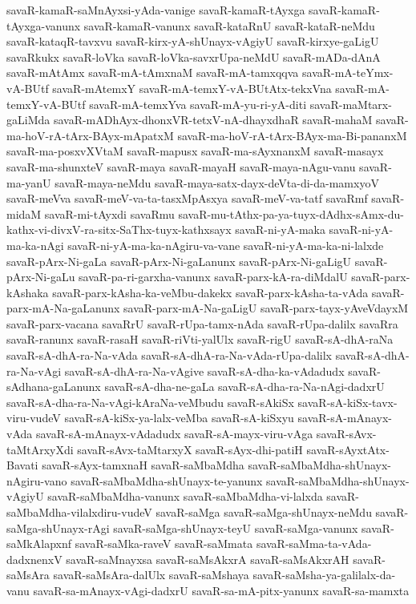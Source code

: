 {savaR-kamaR-saMnAyxsi-yAda-vanige
savaR-kamaR-tAyxga
savaR-kamaR-tAyxga-vanunx
savaR-kamaR-vanunx
savaR-kataRnU
savaR-kataR-neMdu
savaR-kataqR-tavxvu
savaR-kirx-yA-shUnayx-vAgiyU
savaR-kirxye-gaLigU
savaRkukx
savaR-loVka
savaR-loVka-savxrUpa-neMdU
savaR-mADa-dAnA
savaR-mAtAmx
savaR-mA-tAmxnaM
savaR-mA-tamxqqva
savaR-mA-teYmx-vA-BUtf
savaR-mAtemxY
savaR-mA-temxY-vA-BUtAtx-tekxVna
savaR-mA-temxY-vA-BUtf
savaR-mA-temxYva
savaR-mA-yu-ri-yA-diti
savaR-maMtarx-gaLiMda
savaR-mADhAyx-dhonxVR-tetxV-nA-dhayxdhaR
savaR-mahaM
savaR-ma-hoV-rA-tArx-BAyx-mApatxM
savaR-ma-hoV-rA-tArx-BAyx-ma-Bi-pananxM
savaR-ma-posxvXVtaM
savaR-mapusx
savaR-ma-sAyxnanxM
savaR-masayx
savaR-ma-shunxteV
savaR-maya
savaR-mayaH
savaR-maya-nAgu-vanu
savaR-ma-yanU
savaR-maya-neMdu
savaR-maya-satx-dayx-deVta-di-da-mamxyoV
savaR-meVva
savaR-meV-va-ta-tasxMpAsxya
savaR-meV-va-tatf
savaRmf
savaR-midaM
savaR-mi-tAyxdi
savaRmu
savaR-mu-tAthx-pa-ya-tuyx-dAdhx-sAmx-du-kathx-vi-divxV-ra-sitx-SaThx-tuyx-kathxsayx
savaR-ni-yA-maka
savaR-ni-yA-ma-ka-nAgi
savaR-ni-yA-ma-ka-nAgiru-va-vane
savaR-ni-yA-ma-ka-ni-lalxde
savaR-pArx-Ni-gaLa
savaR-pArx-Ni-gaLanunx
savaR-pArx-Ni-gaLigU
savaR-pArx-Ni-gaLu
savaR-pa-ri-garxha-vanunx
savaR-parx-kA-ra-diMdalU
savaR-parx-kAshaka
savaR-parx-kAsha-ka-veMbu-dakekx
savaR-parx-kAsha-ta-vAda
savaR-parx-mA-Na-gaLanunx
savaR-parx-mA-Na-gaLigU
savaR-parx-tayx-yAveVdayxM
savaR-parx-vacana
savaRrU
savaR-rUpa-tamx-nAda
savaR-rUpa-dalilx
savaRra
savaR-ranunx
savaR-rasaH
savaR-riVti-yalUlx
savaR-rigU
savaR-sA-dhA-raNa
savaR-sA-dhA-ra-Na-vAda
savaR-sA-dhA-ra-Na-vAda-rUpa-dalilx
savaR-sA-dhA-ra-Na-vAgi
savaR-sA-dhA-ra-Na-vAgive
savaR-sA-dha-ka-vAdadudx
savaR-sAdhana-gaLanunx
savaR-sA-dha-ne-gaLa
savaR-sA-dha-ra-Na-nAgi-dadxrU
savaR-sA-dha-ra-Na-vAgi-kAraNa-veMbudu
savaR-sAkiSx
savaR-sA-kiSx-tavx-viru-vudeV
savaR-sA-kiSx-ya-lalx-veMba
savaR-sA-kiSxyu
savaR-sA-mAnayx-vAda
savaR-sA-mAnayx-vAdadudx
savaR-sA-mayx-viru-vAga
savaR-sAvx-taMtArxyXdi
savaR-sAvx-taMtarxyX
savaR-sAyx-dhi-patiH
savaR-sAyxtAtx-Bavati
savaR-sAyx-tamxnaH
savaR-saMbaMdha
savaR-saMbaMdha-shUnayx-nAgiru-vano
savaR-saMbaMdha-shUnayx-te-yanunx
savaR-saMbaMdha-shUnayx-vAgiyU
savaR-saMbaMdha-vanunx
savaR-saMbaMdha-vi-lalxda
savaR-saMbaMdha-vilalxdiru-vudeV
savaR-saMga
savaR-saMga-shUnayx-neMdu
savaR-saMga-shUnayx-rAgi
savaR-saMga-shUnayx-teyU
savaR-saMga-vanunx
savaR-saMkAlapxnf
savaR-saMka-raveV
savaR-saMmata
savaR-saMma-ta-vAda-dadxnenxV
savaR-saMnayxsa
savaR-saMsAkxrA
savaR-saMsAkxrAH
savaR-saMsAra
savaR-saMsAra-dalUlx
savaR-saMshaya
savaR-saMsha-ya-galilalx-da-vanu
savaR-sa-mAnayx-vAgi-dadxrU
savaR-sa-mA-pitx-yanunx
savaR-sa-mamxta
}
